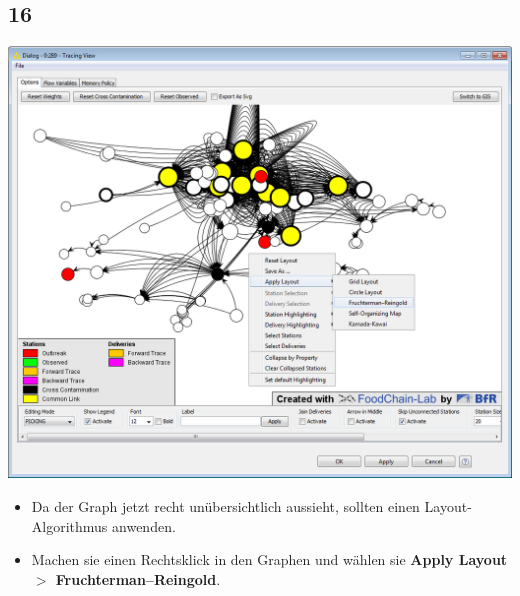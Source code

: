 \documentclass{beamer}
\begin{document}
\subsection{16}
\begin{frame}
	\begin{center}
  		\includegraphics[height=0.6\textheight]{16.png}
	\end{center}
	\begin{itemize}
		\item Da der Graph jetzt recht unübersichtlich aussieht, sollten einen Layout-Algorithmus anwenden.
		\item Machen sie einen Rechtsklick in den Graphen und wählen sie \textbf{Apply Layout $>$ Fruchterman–Reingold}.
	\end{itemize}
\end{frame}
\end{document}
